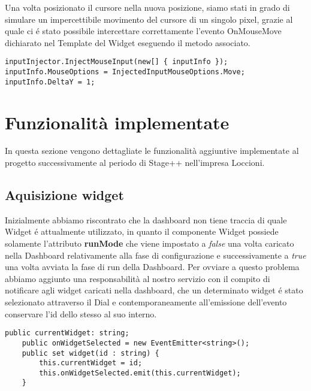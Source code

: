 Una volta posizionato il cursore nella nuova posizione, siamo stati in grado di simulare un impercettibile movimento del cursore di un singolo pixel, grazie al quale ci é stato possibile intercettare correttamente l’evento OnMouseMove dichiarato nel Template del Widget eseguendo il metodo associato.

\vspace{1.0cm}
\begin{lstlisting}[caption={Spostamento cursore},style=javaScriptCode]
inputInjector.InjectMouseInput(new[] { inputInfo });
inputInfo.MouseOptions = InjectedInputMouseOptions.Move;
inputInfo.DeltaY = 1;
\end{lstlisting} 
\vspace{1.0cm} 

\section{Funzionalità implementate}

In questa sezione vengono dettagliate le funzionalità aggiuntive implementate al progetto successivamente al periodo di Stage++ nell'impresa Loccioni.

\subsection{Aquisizione widget}

Inizialmente abbiamo riscontrato che la dashboard non tiene traccia di quale Widget é attualmente utilizzato, in quanto il componente Widget possiede solamente l'attributo \textbf{runMode} che viene impostato a \emph{false} una volta caricato nella Dashboard relativamente alla fase di configurazione e successivamente a \emph{true} una volta avviata la fase di run della Dashboard. Per ovviare a questo problema abbiamo aggiunto una responsabilità al nostro servizio con il compito di notificare agli widget caricati nella dashboard, che un determinato widget é stato selezionato attraverso il Dial e contemporaneamente all'emissione dell'evento conservare l'id dello stesso al suo interno.

\vspace{1.0cm}
\begin{lstlisting}[caption={Notifica selezione Widget e salvataggio id},style=javaScriptCode]
    public currentWidget: string;
    public onWidgetSelected = new EventEmitter<string>();
    public set widget(id : string) {
        this.currentWidget = id;
        this.onWidgetSelected.emit(this.currentWidget);
    }
\end{lstlisting} 
\vspace{1.0cm}

